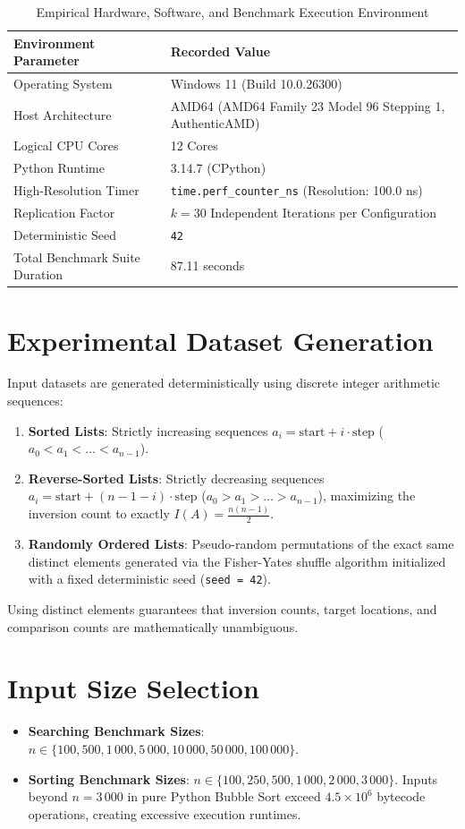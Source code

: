 \documentclass[11pt,a4paper,oneside]{report}
\theoremstyle{definition}
\begin{document}
\begin{table}[htbp]
\centering
\caption{Empirical Hardware, Software, and Benchmark Execution Environment}
\label{tab:environment_metadata}
\small
\begin{tabularx}{\textwidth}{l X}
\toprule
\textbf{Environment Parameter} & \textbf{Recorded Value} \\
\midrule
Operating System & Windows 11 (Build 10.0.26300) \\
Host Architecture & AMD64 (AMD64 Family 23 Model 96 Stepping 1, AuthenticAMD) \\
Logical CPU Cores & 12 Cores \\
Python Runtime & 3.14.7 (CPython) \\
High-Resolution Timer & \texttt{time.perf\_counter\_ns} (Resolution: 100.0 ns) \\
Replication Factor & $k = 30$ Independent Iterations per Configuration \\
Deterministic Seed & \texttt{42} \\
Total Benchmark Suite Duration & 87.11 seconds \\
\bottomrule
\end{tabularx}
\end{table}


\section{Experimental Dataset Generation}
Input datasets are generated deterministically using discrete integer arithmetic sequences:
\begin{enumerate}
    \item \textbf{Sorted Lists}: Strictly increasing sequences $a_i = \text{start} + i \cdot \text{step}$ ($a_0 < a_1 < \dots < a_{n-1}$).
    \item \textbf{Reverse-Sorted Lists}: Strictly decreasing sequences $a_i = \text{start} + (n - 1 - i) \cdot \text{step}$ ($a_0 > a_1 > \dots > a_{n-1}$), maximizing the inversion count to exactly $I(A) = \frac{n(n-1)}{2}$.
    \item \textbf{Randomly Ordered Lists}: Pseudo-random permutations of the exact same distinct elements generated via the Fisher-Yates shuffle algorithm initialized with a fixed deterministic seed (\texttt{seed = 42}).
\end{enumerate}
Using distinct elements guarantees that inversion counts, target locations, and comparison counts are mathematically unambiguous.

\section{Input Size Selection}
\begin{itemize}
    \item \textbf{Searching Benchmark Sizes}: $n \in \{100, 500, 1\,000, 5\,000, 10\,000, 50\,000, 100\,000\}$.
    \item \textbf{Sorting Benchmark Sizes}: $n \in \{100, 250, 500, 1\,000, 2\,000, 3\,000\}$. Inputs beyond $n = 3\,000$ in pure Python Bubble Sort exceed $4.5 \times 10^6$ bytecode operations, creating excessive execution runtimes.
\end{itemize}
\end{document}
